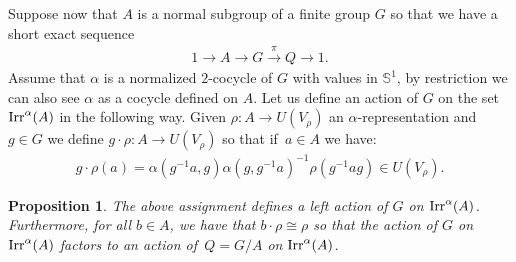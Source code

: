 \documentclass[10pt,a4paper]{amsart}
\def\S{\mathbb{S}}
\DeclareMathOperator{\Irr}{\textup{Irr}}
\newtheorem{Pro}[Th]{Proposition}
\theoremstyle{definition}
\numberwithin{equation}{section}
\begin{document}
Suppose now that $A$ is a normal subgroup of a finite group $G$ so that we have a short exact
sequence
\begin{gather*}
1\rightarrow A\rightarrow G\stackrel{\pi}{\rightarrow} Q\rightarrow 1.
\end{gather*}
Assume that $\alpha$ is a normalized $2$-cocycle of $G$ with values in $\S^{1}$,
by restriction we can also see $\alpha$ as a cocycle defined on $A$.
Let us define an action of $G$ on the set $\Irr^{\alpha}(A)$ in the following way.
Given $\rho\colon A\rightarrow U(V_{\rho})$ an $\alpha$-representation and $g\in G$ we define
$g\cdot \rho\colon A\rightarrow U(V_{\rho})$ so that if~$a\in A$ we have:
\begin{gather}\label{def:act}
g\cdot \rho(a)=\alpha(g^{-1}a,g)\alpha(g,g^{-1}a)^{-1}\rho(g^{-1}ag)\in U(V_{\rho}).
\end{gather}

\begin{Pro}
The above assignment defines a left action of $G$ on $\Irr^{\alpha}(A)$. Furthermore, for all
$b\in A$, we have that $b\cdot\rho\cong\rho$ so that the action of $G$ on $\Irr^{\alpha}(A)$
factors to an action of~$Q=G/A$ on $\Irr^{\alpha}(A)$.
\end{Pro}
\end{document}
